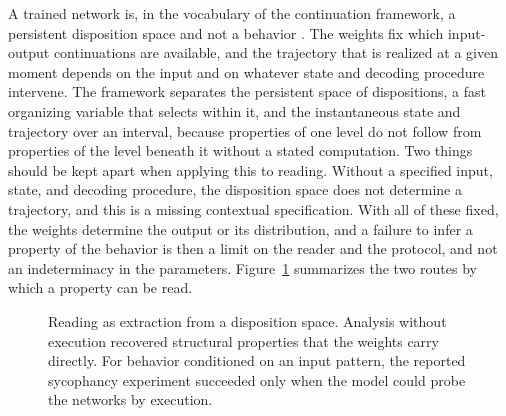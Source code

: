 \documentclass[11pt]{article}
\begin{document}
A trained network is, in the vocabulary of the continuation framework, a persistent disposition space and not a behavior \cite{flyxion2026continuation}. The weights fix which input-output continuations are available, and the trajectory that is realized at a given moment depends on the input and on whatever state and decoding procedure intervene. The framework separates the persistent space of dispositions, a fast organizing variable that selects within it, and the instantaneous state and trajectory over an interval, because properties of one level do not follow from properties of the level beneath it without a stated computation. Two things should be kept apart when applying this to reading. Without a specified input, state, and decoding procedure, the disposition space does not determine a trajectory, and this is a missing contextual specification. With all of these fixed, the weights determine the output or its distribution, and a failure to infer a property of the behavior is then a limit on the reader and the protocol, and not an indeterminacy in the parameters. Figure~\ref{fig:disposition} summarizes the two routes by which a property can be read.

\begin{figure}[htbp]
\centering
{}
\caption{Reading as extraction from a disposition space. Analysis without execution recovered structural properties that the weights carry directly. For behavior conditioned on an input pattern, the reported sycophancy experiment succeeded only when the model could probe the networks by execution.}
\label{fig:disposition}
\end{figure}
\end{document}
